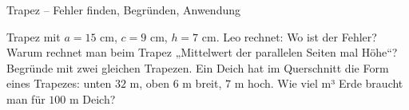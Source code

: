 \begin{aufgabe}{Trapez – Fehler finden, Begründen, Anwendung}
\begin{teile}
\teil Trapez mit $a = 15$ cm, $c = 9$ cm, $h = 7$ cm. Leo rechnet:  Wo ist der Fehler?
\teil Warum rechnet man beim Trapez „Mittelwert der parallelen Seiten mal Höhe“? Begründe mit zwei gleichen Trapezen.
\teil Ein Deich hat im Querschnitt die Form eines Trapezes: unten $32$ m, oben $6$ m breit, $7$ m hoch. Wie viel m³ Erde braucht man für $100$ m Deich?
\end{teile}
\end{aufgabe}
